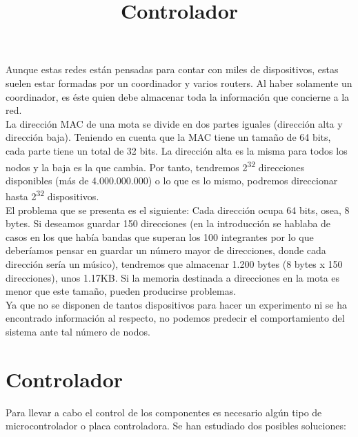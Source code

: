Aunque estas redes están pensadas para contar con miles de dispositivos,
estas suelen estar formadas por un coordinador y varios routers.
Al haber solamente un coordinador, es éste quien debe almacenar
toda la información que concierne a la red.\\

La dirección MAC de una mota se divide en dos partes iguales (dirección alta y dirección baja).
Teniendo en cuenta que la MAC tiene un tamaño de 64 bits, cada parte tiene un total de 32 bits.
La dirección alta es la misma para todos los nodos y la baja es la que cambia. Por tanto, tendremos 2\textsuperscript{32} direcciones
disponibles (más de 4.000.000.000) o lo que es lo mismo, podremos direccionar hasta 2\textsuperscript{32} dispositivos.\\

El problema que se presenta es el siguiente: Cada dirección ocupa 64 bits, osea, 8 bytes. Si deseamos guardar 150
direcciones (en la introducción se hablaba de casos en los que había bandas que superan los 100 integrantes por lo que
deberíamos pensar en guardar un número mayor de direcciones, donde cada dirección sería un músico), tendremos que almacenar
1.200 bytes (8 bytes x 150 direcciones), unos 1.17KB. Si la memoria destinada a direcciones en la mota es menor que este tamaño,
pueden producirse problemas.\\

Ya que no se disponen de tantos dispositivos para hacer un experimento ni se ha encontrado información al respecto,
no podemos predecir el comportamiento del sistema ante tal número de nodos.\\

\section{Controlador}
\title{Controlador}

Para llevar a cabo el control de los componentes es necesario algún tipo de microcontrolador
o placa controladora. Se han estudiado dos posibles soluciones:

